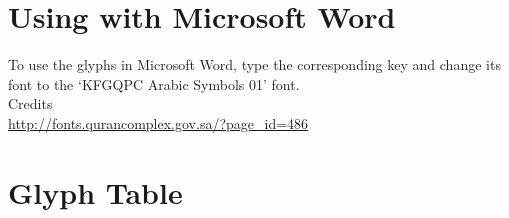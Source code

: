 \documentclass[parskip=full, oneside]{article}
\begin{document}
\section{Using with Microsoft Word}

To use the glyphs in Microsoft Word, type the corresponding key and change its 
font to the `KFGQPC Arabic Symbols 01' font.\\

Credits\\
\url{http://fonts.qurancomplex.gov.sa/?page_id=486}

\section{Glyph Table}

\begin{adjustwidth}{-3cm}{-3cm}

\end{adjustwidth}
\end{document}
